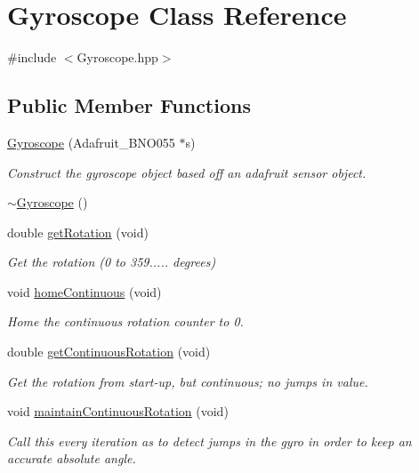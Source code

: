 \hypertarget{class_gyroscope}{}\section{Gyroscope Class Reference}
\label{class_gyroscope}


{\ttfamily \#include $<$Gyroscope.\+hpp$>$}

\subsection*{Public Member Functions}
\begin{DoxyCompactItemize}
\item 
\hyperlink{class_gyroscope_a4bf061fd610528721de8c2e58827f590}{Gyroscope} (Adafruit\+\_\+\+B\+N\+O055 $\ast$s)
\begin{DoxyCompactList}\small\item\em Construct the gyroscope object based off an adafruit sensor object. \end{DoxyCompactList}\item 
\hyperlink{class_gyroscope_aa0e544848270a58f8c9466eb43910dd0}{$\sim$\+Gyroscope} ()
\item 
double \hyperlink{class_gyroscope_a3dc93cb932fd98ce7e129100680887d5}{get\+Rotation} (void)
\begin{DoxyCompactList}\small\item\em Get the rotation (0 to 359..... degrees) \end{DoxyCompactList}\item 
void \hyperlink{class_gyroscope_a121afa879781ade47d27903f3d5d31e5}{home\+Continuous} (void)
\begin{DoxyCompactList}\small\item\em Home the continuous rotation counter to 0. \end{DoxyCompactList}\item 
double \hyperlink{class_gyroscope_a019f1512ef009051ca2a899759321a9e}{get\+Continuous\+Rotation} (void)
\begin{DoxyCompactList}\small\item\em Get the rotation from start-\/up, but continuous; no jumps in value. \end{DoxyCompactList}\item 
void \hyperlink{class_gyroscope_aa785de79696a6ce67e2b2b48b05e6020}{maintain\+Continuous\+Rotation} (void)
\begin{DoxyCompactList}\small\item\em Call this every iteration as to detect jumps in the gyro in order to keep an accurate absolute angle. \end{DoxyCompactList}\end{DoxyCompactItemize}
